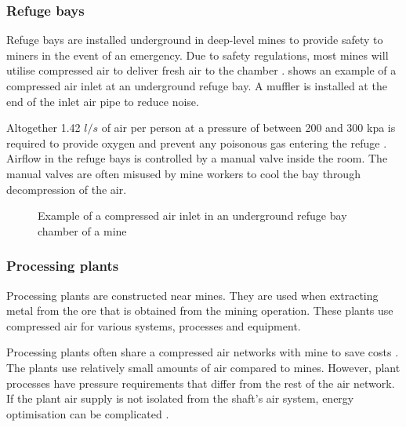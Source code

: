 \subsubsection{Refuge bays}
Refuge bays are installed underground in deep-level mines to provide safety to miners in the event of an emergency. Due to safety regulations, most mines will utilise compressed air to deliver fresh air to the chamber \cite{brake1999criteria}.  shows an example of a compressed air inlet at an underground refuge bay. A muffler is installed at the end of the inlet air pipe to reduce noise.
\par 
Altogether 1.42 $l/s$ of air per person at a pressure of between 200 and 300 \gls{kpa} is required to provide oxygen and prevent any poisonous gas entering the refuge \cite{brake1999criteria}. Airflow in the refuge bays is controlled by a manual valve inside the room. The manual valves are often misused by mine workers to cool the bay through decompression of the air. %
\begin{figure}[!htbp]
	\centering
	\caption{Example of a compressed air inlet in an underground refuge bay chamber of a mine}
	\label{fig: Refuge Bay}
\end{figure}
\subsubsection{Processing plants}
Processing plants are constructed near mines. They are used when extracting metal from the ore that is obtained from the mining operation.  These plants use compressed air for various systems, processes and equipment. 
\par 
Processing plants often share a compressed air networks with mine to save costs \cite{Marais2012PhD}. The plants use relatively small amounts of air compared to mines. However, plant processes have pressure requirements that differ from the rest of the air network. If the plant air supply is not isolated from the shaft's air system, energy optimisation can be complicated \cite{Kriel2014Masters}. 
